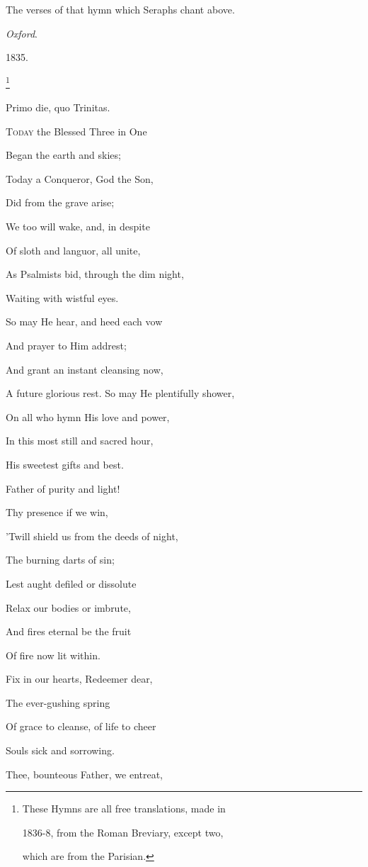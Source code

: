 The verses of that hymn which Seraphs chant above.

\emph{Oxford}.

1835.


\footnote{These Hymns are all free translations, made in

1836-8,
from the Roman Breviary, except two,

which are from
the Parisian.}

Primo die, quo Trinitas.

T\textsc{oday} the Blessed Three in One

Began the earth and skies;

Today a Conqueror, God the Son,

Did from the grave arise;

We too will wake, and, in despite

Of sloth and languor, all unite,

As Psalmists bid, through the dim night,

Waiting with wistful eyes.

So may He hear, and heed each vow

And prayer to Him addrest;

And grant an instant cleansing now,

A future glorious rest. So may He plentifully shower,

On all who hymn His love and power,

In this most still and sacred hour,

His sweetest gifts and best.

Father of purity and light!

Thy presence if we win,

'Twill shield us from the deeds of night,

The burning darts of sin;

Lest aught defiled or dissolute

Relax our bodies or imbrute,

And fires eternal be the fruit

Of fire now lit within.

Fix in our hearts, Redeemer dear,

The ever-gushing spring

Of grace to cleanse, of life to cheer

Souls sick and sorrowing.

Thee, bounteous Father, we entreat,

